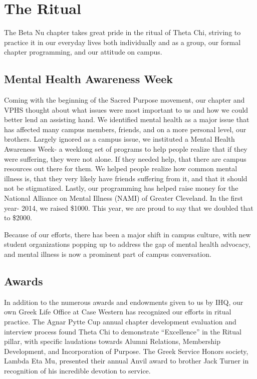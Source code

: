 \chapter{The Ritual}
  
  The Beta Nu chapter takes great pride in the ritual of Theta Chi, striving to practice it in our everyday lives both individually and as a group, our formal chapter programming, and our attitude on campus. 

  \section*{Mental Health Awareness Week}
    Coming with the beginning of the Sacred Purpose movement, our chapter and VPHS thought about what issues were most important to us and how we could better lend an assisting hand. We identified mental health as a major issue that has affected many campus members, friends, and on a more personal level, our brothers. Largely ignored as a campus issue, we instituted a Mental Health Awareness Week- a weeklong set of programs to help people realize that if they were suffering, they were not alone. If they needed help, that there are campus resources out there for them. We helped people realize how common mental illness is, that they very likely have friends suffering from it, and that it should not be stigmatized. Lastly, our programming has helped raise money for the National Alliance on Mental Illness (NAMI) of Greater Cleveland. In the first year- 2014, we raised \$1000. This year, we are proud to say that we doubled that to \$2000.
    
    Because of our efforts, there has been a major shift in campus culture, with new student organizations popping up to address the gap of mental health advocacy, and mental illness is now a prominent part of campus conversation.
    
  \section*{Awards}
    In addition to the numerous awards and endowments given to us by IHQ, our own Greek Life Office at Case Western has recognized our efforts in ritual practice. The Agnar Pytte Cup annual chapter development evaluation and interview process found Theta Chi to demonstrate “Excellence” in the Ritual pillar, with specific laudations towards Alumni Relations, Membership Development, and Incorporation of Purpose. The Greek Service Honors society, Lambda Eta Mu, presented their annual Anvil award to brother Jack Turner in recognition of his incredible devotion to service.\\
    
